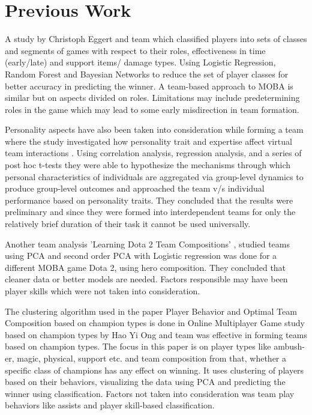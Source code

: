 \documentclass[conference]{IEEEtran}
\begin{document}
\section{Previous Work}
A study by Christoph Eggert and team \cite{Eggert2015} which classified players into sets of classes and segments of games with respect to their roles, effectiveness in time (early/late) and support items/ damage types. Using Logistic Regression, Random Forest and Bayesian Networks to reduce the set of player classes for better accuracy in predicting the winner. A team-based approach to MOBA is similar but on aspects divided on roles. Limitations may include predetermining roles in the game which may lead to some early misdirection in team formation.

 Personality aspects have also been taken into consideration while forming a team where the study investigated how personality trait and expertise affect virtual team interactions \cite{Balthazard2004}. Using correlation analysis, regression analysis, and a series of post hoc t-tests they were able to hypothesize the mechanisms through which personal characteristics of individuals are aggregated via group-level dynamics to produce group-level outcomes and approached the  team v/s individual performance based on personality traits. They concluded that the results were preliminary and since they were formed into interdependent teams for only the relatively brief duration of their task it cannot be used universally.

Another team analysis 'Learning Dota 2 Team Compositions' \cite{Agarwala2014}, studied teams using PCA and second order PCA with Logistic regression was done for a different MOBA game Dota 2, using hero composition. They concluded that cleaner data or better models are needed. Factors responsible may have been player skills which were not taken into consideration.

The clustering algorithm used in the paper Player Behavior and Optimal Team Composition based on champion types is done in Online Multiplayer Game study based on champion types by Hao Yi Ong and team \cite{Bainbridge2009} was effective in forming teams based on champion types. The focus in this paper is on player types like ambush-er, magic, physical, support etc. and team composition from that, whether a specific class of champions has any effect on winning. It uses clustering of players based on their behaviors, visualizing the data using PCA and predicting the winner using classification. Factors not taken into consideration was team play behaviors like assists and player skill-based classification.
\end{document}
